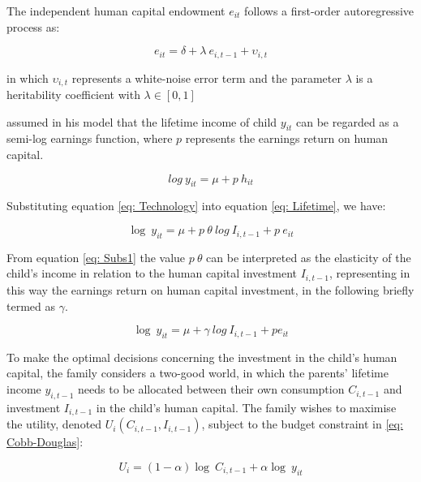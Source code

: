 \documentclass[a4paper, 12pt]{article}
\begin{document}
The independent human capital endowment $e_{it}$ follows a first-order autoregressive process as:


\begin{equation} \label{eq: Human}
e_{it}=\delta + \lambda \: e_{i,t-1}+\upsilon_{i,t}
\end{equation}


in which $\upsilon_{i,t}$ represents a white-noise error term and the parameter $\lambda$ is a heritability coefficient with $\lambda \in [0,1]$


\citet{Solon2004} assumed in his model that the lifetime income of child $y_{it}$ can be regarded as a semi-log earnings function, where $p$ represents the earnings return on human capital.

\begin{equation} \label{eq: Lifetime}
log \ y_{it}=\mu + p \ h_{it} 
\end{equation}


Substituting equation \eqref{eq: Technology} into equation \eqref{eq: Lifetime}, we have: 

\begin{equation} \label{eq: Subs1}
\log \ y_{it}=\mu + p \ \theta \ log \ I_{i,t-1} + p \ e_{it}
\end{equation}

From equation \eqref{eq: Subs1} the value $p \ \theta$ can be interpreted as the elasticity of the child's income in relation to the human capital investment $I_{i,t-1}$, representing in this way the earnings return on human capital investment, in the following briefly termed as $\gamma$. 
 
\begin{equation} \label{eq: Substituting}
\log \ y_{it}=\mu + \gamma \ log \ I_{i,t-1} + pe_{it}
\end{equation}


To make the optimal decisions concerning the investment in the child's human capital, the family considers a two-good world, in which the parents' lifetime income $y_{i,t-1}$ needs to be allocated between their own consumption $C_{i,t-1}$ and investment $I_{i,t-1}$ in the child's human capital. The family wishes to maximise the utility, denoted $U_i(C_{i,t-1},I_{i,t-1})$, subject to the budget constraint in \eqref{eq: Cobb-Douglas}:


\begin{equation} \label{eq: Cobb-Douglas} 
U_i=(1-\alpha) \log \ C_{i,t-1}+ \alpha \log \ y_{it}
\end{equation}
\end{document}
